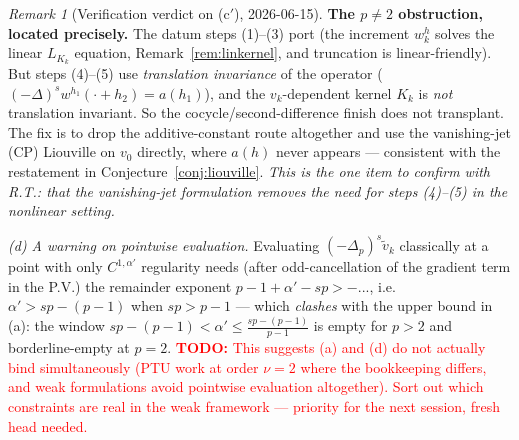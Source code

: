 \documentclass[11pt]{amsart}
\theoremstyle{plain}
\theoremstyle{definition}
\theoremstyle{remark}
\newtheorem{remark}[theorem]{Remark}
\newcommand{\fpl}[1]{(-\Delta_p)^{s}#1}            %
\newcommand{\al}{\alpha}
\newcommand{\TODO}[1]{\textcolor{red}{\textbf{TODO:} #1}}
\begin{document}
\begin{remark}[Verification verdict on (c$'$), 2026-06-15]
\textbf{The $p\neq2$ obstruction, located precisely.} The datum steps
(1)--(3) port (the increment $w^h_k$ solves the linear $L_{K_k}$ equation,
Remark~\ref{rem:linkernel}, and truncation is linear-friendly). But steps
(4)--(5) use \emph{translation invariance} of the operator
($(-\Delta)^sw^{h_1}(\cdot+h_2)=a(h_1)$), and the $v_k$-dependent kernel
$K_k$ is \emph{not} translation invariant. So the cocycle/second-difference
finish does not transplant. The fix is to drop the additive-constant route
altogether and use the vanishing-jet (CP) Liouville on $v_0$ directly,
where $a(h)$ never appears --- consistent with the restatement in
Conjecture~\ref{conj:liouville}. \emph{This is the one item to confirm with
R.T.: that the vanishing-jet formulation removes the need for steps
(4)--(5) in the nonlinear setting.}
\end{remark}

\emph{(d) A warning on pointwise evaluation.} Evaluating
$\fpl{\tilde v_k}$ classically at a point with only $C^{1,\al'}$
regularity needs (after odd-cancellation of the gradient term in the
P.V.) the remainder exponent $p-1+\al'-sp>-... $, i.e.\
$\al'>sp-(p-1)$ when $sp>p-1$ --- which \emph{clashes} with the upper
bound in (a): the window $sp-(p-1)<\al'\le\frac{sp-(p-1)}{p-1}$ is empty
for $p>2$ and borderline-empty at $p=2$. \TODO{This suggests (a) and (d)
do not actually bind simultaneously (PTU work at order $\nu=2$ where the
bookkeeping differs, and weak formulations avoid pointwise evaluation
altogether). Sort out which constraints are real in the weak framework
--- priority for the next session, fresh head needed.}
\end{document}
